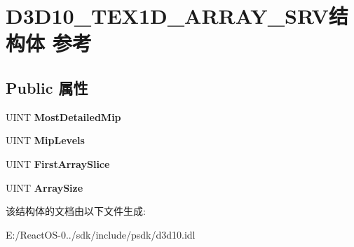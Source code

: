 \hypertarget{struct_d3_d10___t_e_x1_d___a_r_r_a_y___s_r_v}{}\section{D3\+D10\+\_\+\+T\+E\+X1\+D\+\_\+\+A\+R\+R\+A\+Y\+\_\+\+S\+R\+V结构体 参考}
\label{struct_d3_d10___t_e_x1_d___a_r_r_a_y___s_r_v}
\subsection*{Public 属性}
\begin{DoxyCompactItemize}
\item 
\mbox{\label{struct_d3_d10___t_e_x1_d___a_r_r_a_y___s_r_v_ad5d90785a240530565d5590a318b864f}} 
U\+I\+NT {\bfseries Most\+Detailed\+Mip}
\item 
\mbox{\label{struct_d3_d10___t_e_x1_d___a_r_r_a_y___s_r_v_afa033aecd3ebc382bdab5770ea8d4e90}} 
U\+I\+NT {\bfseries Mip\+Levels}
\item 
\mbox{\label{struct_d3_d10___t_e_x1_d___a_r_r_a_y___s_r_v_aa292a7a9af3611b38c1b8b29ee980380}} 
U\+I\+NT {\bfseries First\+Array\+Slice}
\item 
\mbox{\label{struct_d3_d10___t_e_x1_d___a_r_r_a_y___s_r_v_ab36581fd1ea148be7311cea7f5309038}} 
U\+I\+NT {\bfseries Array\+Size}
\end{DoxyCompactItemize}


该结构体的文档由以下文件生成\+:\begin{DoxyCompactItemize}
\item 
E\+:/\+React\+O\+S-\/0../sdk/include/psdk/d3d10.\+idl\end{DoxyCompactItemize}
